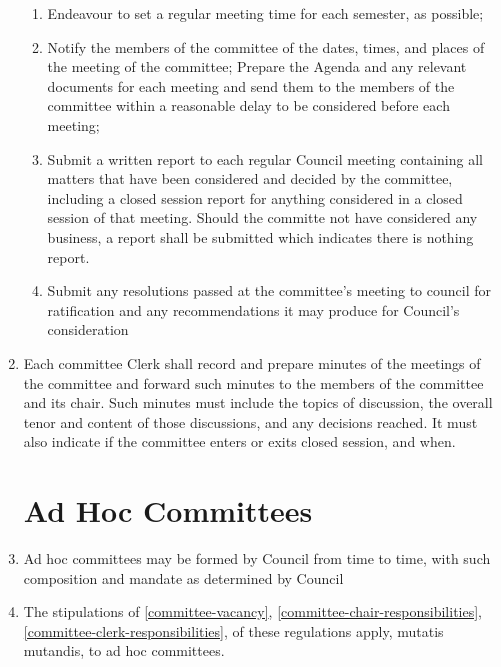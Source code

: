 \documentclass[oneside]{book}
\begin{document}
\begin{enumerate}
\begin{enumerate}
\item Endeavour to set a regular meeting time for each semester, as possible;
\item Notify the members of the committee of the dates, times, and places
of the meeting of the committee; 
Prepare the Agenda and any relevant documents for each meeting and send them to the members of the 
committee within a reasonable delay to be considered before each meeting;
\item Submit a written report to each regular Council meeting containing all matters that have
been considered and decided by the committee, including a closed session report for anything considered 
in a closed session of that meeting. Should the committe not have considered any business, 
a report shall be submitted which indicates there is nothing report. 
\item Submit any resolutions passed at the committee’s meeting to council for ratification and any 
recommendations it may produce for Council’s consideration
\end{enumerate}

\item \label{committee-clerk-responsibilities} Each committee Clerk shall record and prepare minutes of the meetings
of the committee and forward such minutes to the members of the committee and its chair. Such minutes must include 
the topics of discussion, the overall tenor and content of those discussions, and any decisions reached. 
It must also indicate if the committee enters or exits closed session, and when.

\section{\label{Ad_Hoc_Committees}Ad Hoc Committees }
\item Ad hoc committees may be formed by Council from time to time, with
such composition and mandate as determined by Council 
\item The stipulations of \autoref{committee-vacancy}, \autoref{committee-chair-responsibilities}, \autoref{committee-clerk-responsibilities}, of these regulations apply,
mutatis mutandis, to ad hoc committees. 


\end{enumerate}
\end{document}
